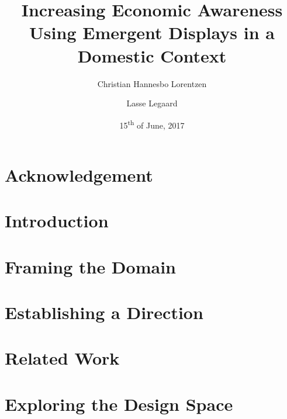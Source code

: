 \documentclass[a4paper, 12pt, twoside]{report}
\title{Increasing Economic Awareness Using Emergent Displays in a Domestic Context}
\author{Christian Hannesbo Lorentzen \and Lasse Legaard}
\date{15\textsuperscript{th} of June, 2017}
\begin{document}
\begin{titlepage}
  
\end{titlepage}

\chapter*{Acknowledgement}
\thispagestyle{empty}


\begin{abstract}
  
\end{abstract}

\tableofcontents


\chapter{Introduction}
\label{ch:introduction}



\chapter{Framing the Domain}
\label{ch:framing-the-domain}



\chapter{Establishing a Direction}
\label{ch:establishing-a-direction}



\chapter{Related Work}
\label{ch:related-work}



\chapter{Exploring the Design Space}
\label{ch:exploring-the-design-space}

\end{document}
